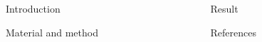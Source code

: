 \documentclass[final,dvipdfmx]{beamer}
\begin{document}
\vspace{10mm}

\begin{columns}[T]
  \begin{column}{0.49\columnwidth}
    \begin{block}{\Large Introduction}
      \begin{flushleft}
        
      \end{flushleft}
    \end{block}

    \begin{block}{\Large Material and method}
      \begin{flushleft}
        
      \end{flushleft}
    \end{block}

  \end{column}

  \begin{column}{0.49\columnwidth}

    \begin{block}{\Large Result}
      \begin{flushleft}
        
      \end{flushleft}
    \end{block}

    \begin{block}{\Large References}
      \begin{figure}
        \begin{flushleft}
          \beamertemplatetextbibitems
          
          
        \end{flushleft}
      \end{figure}
    \end{block}


  \end{column}

\end{columns}
\end{document}
